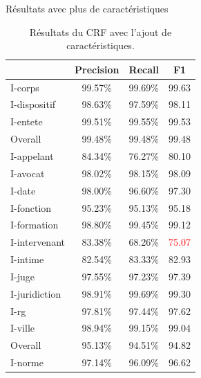 \documentclass[newPxFont,pagenumber]{beamer}
\begin{document}
\begin{frame}{Résultats avec plus de caractéristiques}
\begin{table}
\scriptsize
\begin{tabular}{|l|ccc|}
\hline
         & Precision &  Recall  & F1 \\\hline
I-corps &   99.57\% &  99.69\% &  99.63 \\
I-dispositif &   98.63\% &  97.59\% &  98.11 \\
I-entete &   99.51\% &  99.55\% &  99.53 \\\hline
Overall &   99.48\% &  99.48\% &  99.48 \\\hline
 \noalign{\smallskip}\hline\noalign{\smallskip}
I-appelant &   84.34\% &  76.27\% &  80.10 \\
I-avocat &   98.02\% &  98.15\% &  98.09 \\
I-date  &   98.00\% &  96.60\% &  97.30 \\
I-fonction &   95.23\% &  95.13\% &  95.18 \\
I-formation &   98.80\% &  99.45\% &  99.12 \\
I-intervenant &   83.38\% &  68.26\% &  \textcolor{red}{75.07} \\
I-intime &   82.54\% &  83.33\% &  82.93 \\
I-juge  &   97.55\% &  97.23\% &  97.39 \\
I-juridiction &   98.91\% &  99.69\% &  99.30 \\
I-rg    &   97.81\% &  97.44\% &  97.62 \\
I-ville &   98.94\% &  99.15\% &  99.04 \\\hline
Overall &   95.13\% &  94.51\% &  94.82 \\\hline
 \noalign{\smallskip}\hline\noalign{\smallskip}
I-norme &   97.14\% &  96.09\% &  96.62 \\\hline
\end{tabular}
\caption{Résultats du CRF avec l'ajout de caractéristiques.}
\end{table}
\end{frame}
\end{document}
